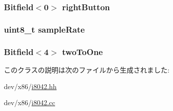 \hypertarget{classX86ISA_1_1PS2Mouse_ad3b9d6ae9675e18b890099ea98665858}{
\subsubsection[{rightButton}]{\setlength{\rightskip}{0pt plus 5cm}Bitfield$<$0$>$ {\bf rightButton}}}
\label{classX86ISA_1_1PS2Mouse_ad3b9d6ae9675e18b890099ea98665858}
\hypertarget{classX86ISA_1_1PS2Mouse_a5022f9261e83b503585507a1028d344e}{
\subsubsection[{sampleRate}]{\setlength{\rightskip}{0pt plus 5cm}uint8\_\-t {\bf sampleRate}}}
\label{classX86ISA_1_1PS2Mouse_a5022f9261e83b503585507a1028d344e}
\hypertarget{classX86ISA_1_1PS2Mouse_ad672b278dde865a7b38ff03434e9a8ac}{
\subsubsection[{twoToOne}]{\setlength{\rightskip}{0pt plus 5cm}Bitfield$<$4$>$ {\bf twoToOne}}}
\label{classX86ISA_1_1PS2Mouse_ad672b278dde865a7b38ff03434e9a8ac}


このクラスの説明は次のファイルから生成されました:\begin{DoxyCompactItemize}
\item 
dev/x86/\hyperlink{i8042_8hh}{i8042.hh}\item 
dev/x86/\hyperlink{i8042_8cc}{i8042.cc}\end{DoxyCompactItemize}
